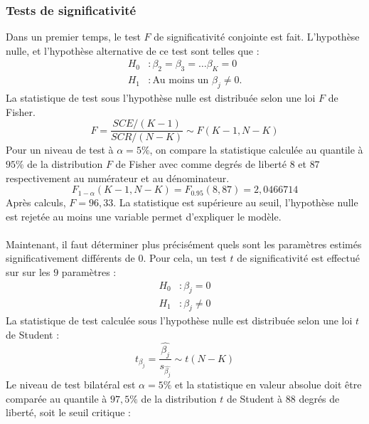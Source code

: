 \documentclass{article}
\begin{document}
\subsubsection{Tests de significativité}
\label{sec:testSigni1}
Dans un premier temps, le test $F$ de significativité conjointe est fait. L'hypothèse nulle, et l'hypothèse alternative de ce test sont telles que :
\begin{equation*}
\begin{split}
    H_0 &: \beta_2 = \beta_3 = \dots \beta_K =0 \\
    H_1 &: \text{Au moins un }\beta_j \neq 0.
\end{split}
\end{equation*}
La statistique de test sous l'hypothèse nulle est distribuée selon une loi $F$ de Fisher.
\begin{equation*}
    F = \frac{SCE/(K-1)}{SCR/(N-K)} \sim F(K-1, N-K)
\end{equation*}
Pour un niveau de test à $\alpha = 5\%$, on compare la statistique calculée au quantile à $95\%$ de la distribution $F$ de Fisher avec 
comme degrés de liberté $8$ et $87$ respectivement au numérateur et au dénominateur. 
\begin{equation*}
    F_{1-\alpha} (K-1, N-K) = F_{0.95}(8, 87) = 2,0466714
\end{equation*}
Après calculs, $F = 96,33$. La statistique est supérieure au seuil, l'hypothèse nulle est rejetée au moins une variable permet d'expliquer le modèle.
\\ \\
Maintenant, il faut déterminer plus précisément quels sont les paramètres estimés significativement différents de 0. Pour cela, un test $t$ de 
significativité est effectué sur sur les $9$ paramètres :
\begin{equation*}
\begin{split}
    H_0 &: \beta_j =0 \\
    H_1 &: \beta_j \neq 0
\end{split}
\end{equation*}
La statistique de test calculée sous l'hypothèse nulle est distribuée selon une loi $t$ de Student : 
\begin{equation*}
    t_{\beta_j} = \frac{\hat{\beta_j}}{s_{\hat{\beta_j}}} \sim t(N-K)
\end{equation*}
Le niveau de test bilatéral est $\alpha = 5\%$ et la statistique en valeur absolue doit être comparée au quantile à $97,5\%$ de la distribution
 $t$ de Student à $88$ degrés de liberté, soit le seuil critique :
\end{document}
